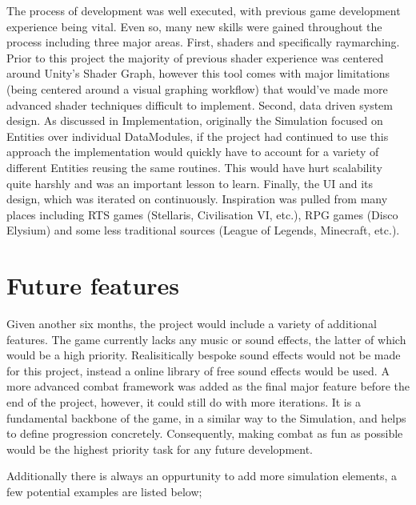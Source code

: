 \documentclass{report}
\begin{document}
The process of development was well executed, with previous game development experience being vital. Even so, many new skills were gained throughout the process including three major areas. First, shaders and specifically raymarching. Prior to this project the majority of previous shader experience was centered around Unity's Shader Graph, however this tool comes with major limitations (being centered around a visual graphing workflow) that would've made more advanced shader techniques difficult to implement. Second, data driven system design. As discussed in Implementation, originally the Simulation focused on Entities over individual DataModules, if the project had continued to use this approach the implementation would quickly have to account for a variety of different Entities reusing the same routines. This would have hurt scalability quite harshly and was an important lesson to learn. Finally, the UI and its design, which was iterated on continuously. Inspiration was pulled from many places including RTS games (Stellaris, Civilisation VI, etc.), RPG games (Disco Elysium) and some less traditional sources (League of Legends, Minecraft, etc.).

\section{Future features}

Given another six months, the project would include a variety of additional features. The game currently lacks any music or sound effects, the latter of which would be a high priority. Realisitically bespoke sound effects would not be made for this project, instead a online library of free sound effects would be used. A more advanced combat framework was added as the final major feature before the end of the project, however, it could still do with more iterations. It is a fundamental backbone of the game, in a similar way to the Simulation, and helps to define progression concretely. Consequently, making combat as fun as possible would be the highest priority task for any future development.

Additionally there is always an oppurtunity to add more simulation elements, a few potential examples are listed below;
\end{document}
